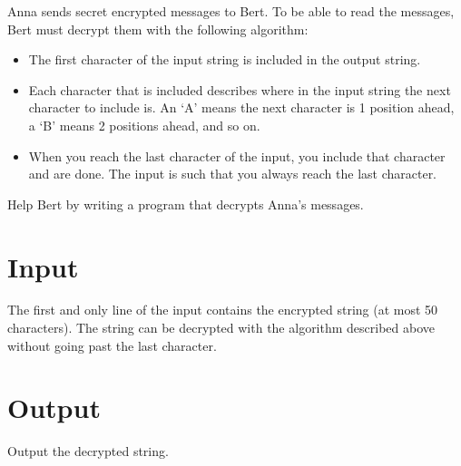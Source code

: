 
Anna sends secret encrypted messages to Bert. To be able to read the messages,
Bert must decrypt them with the following algorithm:

\begin{itemize}
  \item The first character of the input string is included in the output string.
  \item Each character that is included describes where in the input string the next
    character to include is. An `A' means the next character is 1 position ahead, a
    `B' means 2 positions ahead, and so on.
  \item When you reach the last character of the input, you include that
    character and are done. The input is such that you always reach
    the last character.
\end{itemize}

Help Bert by writing a program that decrypts Anna's messages.

\section*{Input}

The first and only line of the input contains the encrypted string (at most 50 characters). The string
can be decrypted with the algorithm described above without going past
the last character. 

\section*{Output}

Output the decrypted string.
